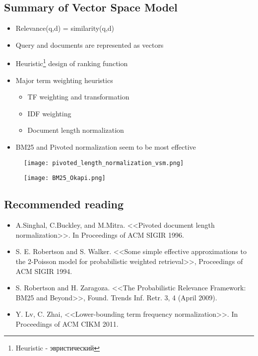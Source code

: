 \subsection{Summary of Vector Space Model}
\begin{itemize}
\item Relevance(q,d) = similarity(q,d)
\item Query and documents are represented as vectors
\item Heuristic\footnote{Heuristic - эвристический} design of ranking function

\item Major term weighting heuristics 
\begin{itemize}
\item TF weighting and transformation 
\item IDF weighting
\item Document length normalization
\end{itemize}

\item BM25 and Pivoted normalization seem to be most effective
\end{itemize}

\begin{figure}[H]
    \centering
    \texttt{[image: pivoted\_length\_normalization\_vsm.png]}
\end{figure}
\begin{figure}[H]
    \centering
    \texttt{[image: BM25\_Okapi.png]}
\end{figure}


\subsection{Recommended reading}
\begin{itemize}
\item A.Singhal, C.Buckley, and M.Mitra. <<Pivoted document length normalization>>. In Proceedings of ACM SIGIR 1996.
\item S. E. Robertson and S. Walker. <<Some simple effective approximations to the 2-Poisson model for probabilistic weighted retrieval>>, Proceedings of ACM SIGIR 1994.
\item S. Robertson and H. Zaragoza. <<The Probabilistic Relevance Framework: BM25 and Beyond>>, Found. Trends Inf. Retr. 3, 4 (April 2009).
\item Y. Lv, C. Zhai, <<Lower-bounding term frequency normalization>>. In Proceedings of ACM CIKM 2011.
\end{itemize}

